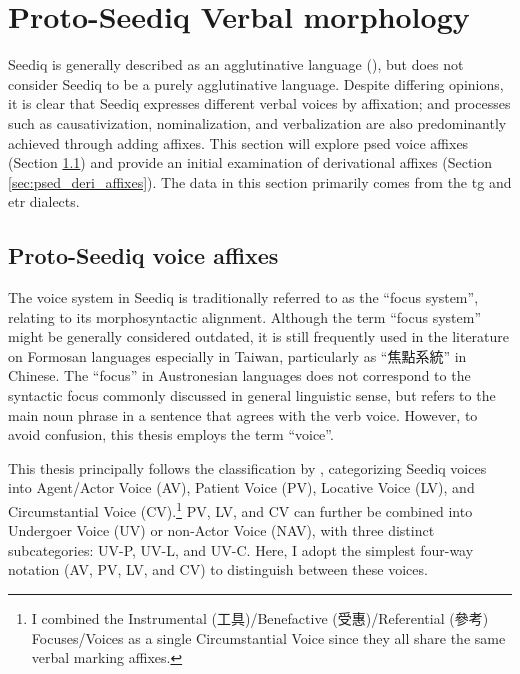\section{Proto-Seediq Verbal morphology} \label{sec:psed_aff}

Seediq is generally described as an agglutinative language (\cite{tsukida2012}), but \textcite{holmer1996parametric} does not consider Seediq to be a purely agglutinative language. Despite differing opinions, it is clear that Seediq expresses different verbal voices by affixation; and processes such as causativization, nominalization, and verbalization are also predominantly achieved through adding affixes. This section will explore \acl{psed} voice affixes (Section \ref{sec:psed_voice_affixes}) and provide an initial examination of derivational affixes (Section \ref{sec:psed_deri_affixes}). The data in this section primarily comes from the \acl{tg} and \acl{etr} dialects.

\subsection{Proto-Seediq voice affixes} \label{sec:psed_voice_affixes}

The voice system in Seediq is traditionally referred to as the ``focus system'', relating to its morphosyntactic alignment. Although the term ``focus system'' might be generally considered outdated, it is still frequently used in the literature on Formosan languages especially in Taiwan, particularly as ``焦點系統'' in Chinese. The ``focus'' in Austronesian languages does not correspond to the syntactic focus commonly discussed in general linguistic sense, but refers to the main noun phrase in a sentence that agrees with the verb voice. However, to avoid confusion, this thesis employs the term ``voice''.

This thesis principally follows the classification by \textcite{Sung2018Sedgrammar,Lee2018Trugrammar}, categorizing Seediq voices into Agent/Actor Voice (AV), Patient Voice (PV), Locative Voice (LV), and Circumstantial Voice (CV).\footnote{I combined the Instrumental (工具)/Benefactive (受惠)/Referential (參考) Focuses/Voices as a single Circumstantial Voice since they all share the same verbal marking affixes.} PV, LV, and CV can further be combined into Undergoer Voice (UV) or non-Actor Voice (NAV), with three distinct subcategories: UV-P, UV-L, and UV-C. Here, I adopt the simplest four-way notation (AV, PV, LV, and CV) to distinguish between these voices.

